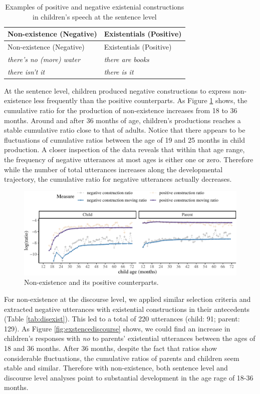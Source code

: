\documentclass[
  english,
  man,floatsintext]{apa6}
\begin{document}
\begin{longtable}[]{@{}ll@{}}
\caption{\label{tab:nonexist} Examples of positive and negative existenial constructions in children's speech at the sentence level}\tabularnewline
\toprule
Non-existence (Negative) & Existentials (Positive) \\
\midrule
\endfirsthead
\toprule
Non-existence (Negative) & Existentials (Positive) \\
\midrule
\endhead
\emph{there's no (more) water} & \emph{there are books} \\
\emph{there isn't it} & \emph{there is it} \\
\bottomrule
\end{longtable}

At the sentence level, children produced negative constructions to express non-existence less frequently than the positive counterparts. As Figure \ref{fig:existence} shows, the cumulative ratio for the production of non-existence increases from 18 to 36 months. Around and after 36 months of age, children's productions reaches a stable cumulative ratio close to that of adults. Notice that there appears to be fluctuations of cumulative ratios between the age of 19 and 25 months in child production. A closer inspection of the data reveals that within that age range, the frequency of negative utterances at most ages is either one or zero. Therefore while the number of total utterances increases along the developmental trajectory, the cumulative ratio for negative utterances actually decreases.

\begin{figure}[H]

{\centering \includegraphics{neg_construction_article_files/figure-latex/existence-1} 

}

\caption{Non-existence and its positive counterparts.}\label{fig:existence}
\end{figure}

For non-existence at the discourse level, we applied similar selection criteria and extracted negative utterances with existential constructions in their antecedents (Table \ref{tab:disexist}). This led to a total of 220 utterances (child: 91; parent: 129). As Figure \ref{fig:exstencediscourse} shows, we could find an increase in children's responses with \emph{no} to parents' existential utterances between the ages of 18 and 36 months. After 36 months, despite the fact that ratios show considerable fluctuations, the cumulative ratios of parents and children seem stable and similar. Therefore with non-existence, both sentence level and discourse level analyses point to substantial development in the age rage of 18-36 months.
\end{document}
